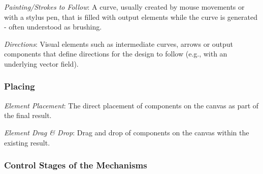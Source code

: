 \textit{Painting/Strokes to Follow}: A curve, usually created by mouse movements or with a stylus pen, that is filled with output elements while the curve is generated - often understood as brushing.

\textit{Directions}: Visual elements such as intermediate curves, arrows or output components that define directions for the design to follow (e.g., with an underlying vector field).


\subsubsection{Placing}


\textit{Element Placement}: The direct placement of components on the canvas as part of the final result.

\textit{Element Drag \& Drop}: Drag and drop of components on the canvas within the existing result.


\subsubsection{Control Stages of the Mechanisms}
\label{subsec:taxo_control_stages}



